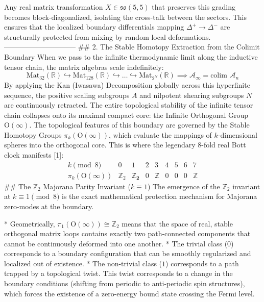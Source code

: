 Any real matrix transformation $X \in \mathfrak{so}(5,5)$ that preserves this grading becomes block-diagonalized, isolating the cross-talk between the sectors. This ensures that the localized boundary differentials mapping $\Delta^+ \to \Delta^-$ are structurally protected from mixing by random local deformations.
------------------------------
## 2. The Stable Homotopy Extraction from the Colimit Boundary
When we pass to the infinite thermodynamic limit along the inductive tensor chain, the matrix algebras scale indefinitely:
$$\text{Mat}_{32}(\mathbb{R}) \hookrightarrow \text{Mat}_{128}(\mathbb{R}) \hookrightarrow \dots \hookrightarrow \text{Mat}_{2^N}(\mathbb{R}) \implies \mathcal{A}_\infty = \text{colim }\mathcal{A}_n$$ 
By applying the Kan (Iwasawa) Decomposition globally across this hyperfinite sequence, the positive scaling subgroups $A$ and nilpotent shearing subgroups $N$ are continuously retracted. The entire topological stability of the infinite tensor chain collapses onto its maximal compact core: the Infinite Orthogonal Group $\text{O}(\infty)$.
The topological features of this boundary are governed by the Stable Homotopy Groups $\pi_k(\text{O}(\infty))$, which evaluate the mappings of $k$-dimensional spheres into the orthogonal core. This is where the legendary 8-fold real Bott clock manifests [1]:
$$\begin{array}{c|c|c|c|c|c|c|c|c} k \pmod 8 & 0 & 1 & 2 & 3 & 4 & 5 & 6 & 7 \\ \hline \pi_k(\text{O}(\infty)) & \mathbb{Z}_2 & \mathbf{\mathbb{Z}_2} & 0 & \mathbb{Z} & 0 & 0 & 0 & \mathbb{Z} \end{array}$$ 
## The $\mathbb{Z}_2$ Majorana Parity Invariant ($k \equiv 1$)
The emergence of the $\mathbb{Z}_2$ invariant at $k \equiv 1 \pmod 8$ is the exact mathematical protection mechanism for Majorana zero-modes at the boundary.

* Geometrically, $\pi_1(\text{O}(\infty)) \cong \mathbb{Z}_2$ means that the space of real, stable orthogonal matrix loops contains exactly two path-connected components that cannot be continuously deformed into one another.
* The trivial class ($0$) corresponds to a boundary configuration that can be smoothly regularized and localized out of existence.
* The non-trivial class ($1$) corresponds to a path trapped by a topological twist. This twist corresponds to a change in the boundary conditions (shifting from periodic to anti-periodic spin structures), which forces the existence of a zero-energy bound state crossing the Fermi level.

